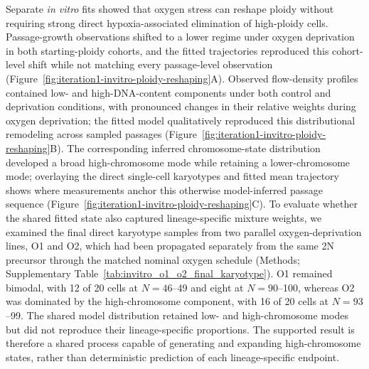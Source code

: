 \documentclass[11pt]{article}
\begin{document}
Separate \textit{in vitro} fits showed that oxygen stress can reshape ploidy without requiring strong direct hypoxia-associated elimination of high-ploidy cells. Passage-growth observations shifted to a lower regime under oxygen deprivation in both starting-ploidy cohorts, and the fitted trajectories reproduced this cohort-level shift while not matching every passage-level observation (Figure~\ref{fig:iteration1-invitro-ploidy-reshaping}A). Observed flow-density profiles contained low- and high-DNA-content components under both control and deprivation conditions, with pronounced changes in their relative weights during oxygen deprivation; the fitted model qualitatively reproduced this distributional remodeling across sampled passages (Figure~\ref{fig:iteration1-invitro-ploidy-reshaping}B). The corresponding inferred chromosome-state distribution developed a broad high-chromosome mode while retaining a lower-chromosome mode; overlaying the direct single-cell karyotypes and fitted mean trajectory shows where measurements anchor this otherwise model-inferred passage sequence (Figure~\ref{fig:iteration1-invitro-ploidy-reshaping}C). To evaluate whether the shared fitted state also captured lineage-specific mixture weights, we examined the final direct karyotype samples from two parallel oxygen-deprivation lines, O1 and O2, which had been propagated separately from the same 2N precursor through the matched nominal oxygen schedule (Methods; Supplementary Table~\ref{tab:invitro_o1_o2_final_karyotype}). O1 remained bimodal, with 12 of 20 cells at \(N=46\)--49 and eight at \(N=90\)--100, whereas O2 was dominated by the high-chromosome component, with 16 of 20 cells at \(N=93\)--99. The shared model distribution retained low- and high-chromosome modes but did not reproduce their lineage-specific proportions. The supported result is therefore a shared process capable of generating and expanding high-chromosome states, rather than deterministic prediction of each lineage-specific endpoint.
\end{document}
